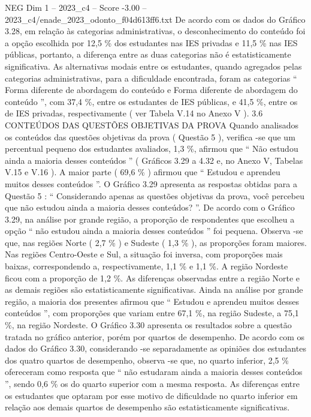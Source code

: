 \begin{textsample}{NEG Dim 1 – 2023\_c4 – Score -3.00 – 2023\_c4/enade\_2023\_odonto\_f04d613ff6.txt}
De acordo com os dados do Gráfico 3.28, em relação às categorias administrativas, o desconhecimento do conteúdo foi a opção escolhida por 12,5 \% dos estudantes nas IES privadas e 11,5 \% nas IES públicas, portanto, a diferença entre as duas categorias não é estatisticamente significativa.
As alternativas modais entre os estudantes, quando agregados pelas categorias administrativas, para a dificuldade encontrada, foram as categorias “ Forma diferente de abordagem do conteúdo e Forma diferente de abordagem do conteúdo ”, com 37,4 \%, entre os estudantes de IES públicas, e 41,5 \%, entre os de IES privadas, respectivamente ( ver Tabela V.14 no Anexo V ). 3.6 CONTEÚDOS DAS QUESTÕES OBJETIVAS DA PROVA Quando analisados os conteúdos das questões objetivas da prova ( Questão 5 ), verifica -se que um percentual pequeno dos estudantes avaliados, 1,3 \%, afirmou que “ Não estudou ainda a maioria desses conteúdos ” ( Gráficos 3.29 a 4.32 e, no Anexo V, Tabelas V.15 e V.16 ).
A maior parte ( 69,6 \% ) afirmou que “ Estudou e aprendeu muitos desses conteúdos ”.
O Gráfico 3.29 apresenta as respostas obtidas para a Questão 5 : “ Considerando apenas as questões objetivas da prova, você percebeu que não estudou ainda a maioria desses conteúdos? ”.
De acordo com o Gráfico 3.29, na análise por grande região, a proporção de respondentes que escolheu a opção “ não estudou ainda a maioria desses conteúdos ” foi pequena.
Observa -se que, nas regiões Norte ( 2,7 \% ) e Sudeste ( 1,3 \% ), as proporções foram maiores.
Nas regiões Centro-Oeste e Sul, a situação foi inversa, com proporções mais baixas, correspondendo a, respectivamente, 1,1 \% e 1,1 \%.
A região Nordeste ficou com a proporção de 1,2 \%.
As diferenças observadas entre a região Norte e as demais regiões são estatisticamente significativas.
Ainda na análise por grande região, a maioria dos presentes afirmou que “ Estudou e aprendeu muitos desses conteúdos ”, com proporções que variam entre 67,1 \%, na região Sudeste, a 75,1 \%, na região Nordeste.
O Gráfico 3.30 apresenta os resultados sobre a questão tratada no gráfico anterior, porém por quartos de desempenho.
De acordo com os dados do Gráfico 3.30, considerando -se separadamente as opiniões dos estudantes dos quatro quartos de desempenho, observa -se que, no quarto inferior, 2,5 \% ofereceram como resposta que “ não estudaram ainda a maioria desses conteúdos ”, sendo 0,6 \% os do quarto superior com a mesma resposta.
As diferenças entre os estudantes que optaram por esse motivo de dificuldade no quarto inferior em relação aos demais quartos de desempenho são estatisticamente significativas.

\end{textsample}
